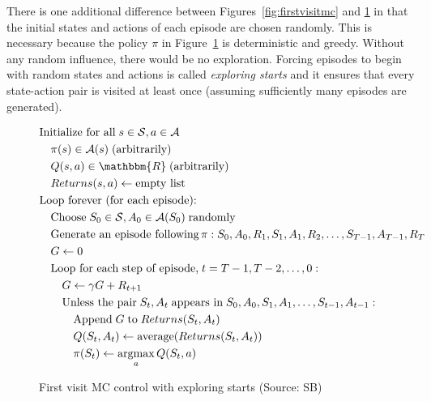 There is one additional difference between Figures~\ref{fig:firstvisitmc} and \ref{fig:firstvisitcontrol} in that the initial states and actions of each episode are chosen randomly. This is necessary because the policy $\pi$ in Figure~\ref{fig:firstvisitcontrol} is deterministic and greedy. Without any random influence, there would be no exploration. Forcing episodes to begin with random states and actions is called \emph{exploring starts} and it ensures that every state-action pair is visited at least once (assuming sufficiently many episodes are generated).

\begin{figure}
\begin{pseudocodebox}
\small
\vspace{-\baselineskip}
\begin{align*}
& \text{Initialize for all}\; s \in \mathcal{S}, a \in \mathcal{A} \\
& \quad \pi(s) \in \mathcal{A}(s) \; \text{(arbitrarily)} \\
& \quad Q(s,a) \in \mathbbm{R}\; \text{(arbitrarily)} \\
& \quad Returns(s, a) \leftarrow \text{empty list} \\
& \text{Loop forever (for each episode):} \\
& \quad \text{Choose}\; S_0 \in \mathcal{S}, A_0 \in \mathcal{A}(S_0)\; \text{randomly} \\
& \quad \text{Generate an episode following}\, \pi: S_0, A_0, R_1, S_1, A_1, R_2, \ldots, S_{T-1}, A_{T-1}, R_{T} \\
& \quad G \leftarrow 0 \\
& \quad \text{Loop for each step of episode,}\; t = T-1, T-2, \ldots, 0: \\
& \quad \quad G \leftarrow \gamma G + R_{t+1} \\
& \quad \quad \text{Unless the pair}\; S_t, A_t \; \text{appears in}\; S_0, A_0, S_1, A_1, \ldots, S_{t-1}, A_{t-1}: \\
& \quad \quad \quad \text{Append}\; G\; \text{to}\; Returns(S_t, A_t) \\
& \quad \quad \quad Q(S_t, A_t) \leftarrow \operatorname{average}(Returns(S_t, A_t)) \\
& \quad \quad \quad \pi(S_t) \leftarrow \operatorname*{arg max}_a Q(S_t, a)
\end{align*}
\end{pseudocodebox}
\caption[First visit MC control with exploring starts]{First visit MC control with exploring starts (Source: SB)}
\label{fig:firstvisitcontrol}
\end{figure}


